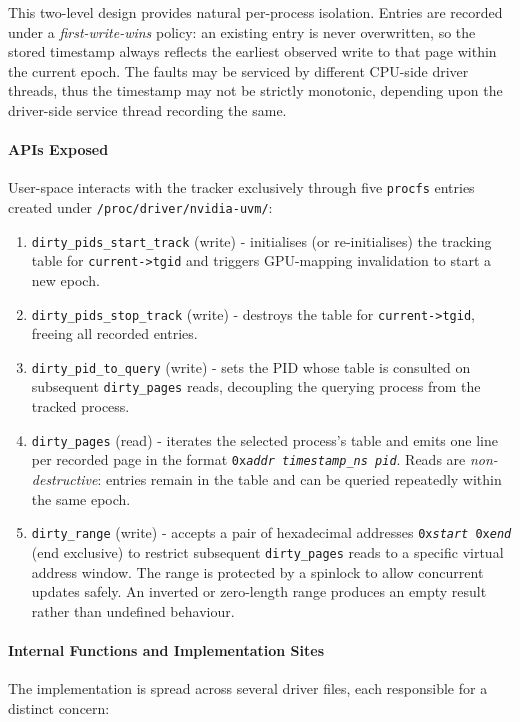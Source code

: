 This two-level design provides natural per-process isolation. Entries are recorded under a
\emph{first-write-wins} policy: an existing entry is never overwritten, so the
stored timestamp always reflects the earliest observed write to that page within
the current epoch. The faults may be serviced by different CPU-side driver threads, 
thus the timestamp may not be strictly monotonic, depending upon the driver-side service thread
recording the same.

\paragraph{APIs Exposed}
User-space interacts with the tracker exclusively through five
\texttt{procfs} entries created under \texttt{/proc/driver/nvidia-uvm/}:

\begin{enumerate}
    \item \texttt{dirty\_pids\_start\_track} (write) - initialises (or
          re-initialises) the tracking table for \texttt{current->tgid} and
          triggers GPU-mapping invalidation to start a new epoch.
    \item \texttt{dirty\_pids\_stop\_track} (write) - destroys the table for
          \texttt{current->tgid}, freeing all recorded entries.
    \item \texttt{dirty\_pid\_to\_query} (write) - sets the PID whose table
          is consulted on subsequent \texttt{dirty\_pages} reads, decoupling
          the querying process from the tracked process.
    \item \texttt{dirty\_pages} (read) - iterates the selected process's
          table and emits one line per recorded page in the format
          \texttt{0x\textit{addr}\ \textit{timestamp\_ns}\ \textit{pid}}.
          Reads are \emph{non-destructive}: entries remain in the table and
          can be queried repeatedly within the same epoch.
    \item \texttt{dirty\_range} (write) - accepts a pair of hexadecimal
          addresses \texttt{0x\textit{start}\ 0x\textit{end}} (end exclusive)
          to restrict subsequent \texttt{dirty\_pages} reads to a specific
          virtual address window. The range is protected by a spinlock to
          allow concurrent updates safely. An inverted or zero-length range
          produces an empty result rather than undefined behaviour.
\end{enumerate}

\paragraph{Internal Functions and Implementation Sites}
The implementation is spread across several driver files, each responsible for
a distinct concern:

